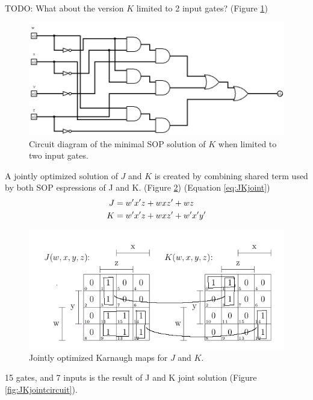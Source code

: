 \documentclass[12pt]{article}
\begin{document}
TODO: What about the version $K$ limited to 2 input gates?
(Figure \ref{fig:Kminsop-02})
\begin{figure}[!htb]
\center
\includegraphics[scale=0.5]{Kminsop-02}
\caption{Circuit diagram of the minimal SOP solution of $K$ when limited to two input gates.}
\label{fig:Kminsop-02}
\end{figure}
\clearpage
A jointly optimized solution of $J$ and $K$ is created by combining shared term used by both SOP espressions of J and K.
(Figure \ref{fig:JKjointkmap})
(Equation \ref{eq:JKjoint})
\begin{align}
J &= w'x'z + wxz' + wz \notag \\
K &= w'x'z + wxz' + w'x'y' \label{eq:JKjoint}
\end{align}
\begin{figure}[!htb]
\center
\includegraphics[scale=0.60]{JKkmap-01}
\caption{Jointly optimized Karnaugh maps for $J$ and $K$.}
\label{fig:JKjointkmap}
\end{figure}
15 gates, and 7 inputs is the result of J and K joint solution
(Figure \ref{fig:JKjointcircuit}).
\end{document}
